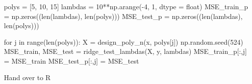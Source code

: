 \documentclass[
  letterpaper,
  DIV=11,
  numbers=noendperiod]{scrartcl}
\newenvironment{Shaded}{\begin{snugshade}}{\end{snugshade}}
\newcommand{\BuiltInTok}[1]{\textcolor[rgb]{0.00,0.23,0.31}{#1}}
\newcommand{\ControlFlowTok}[1]{\textcolor[rgb]{0.00,0.23,0.31}{#1}}
\newcommand{\DecValTok}[1]{\textcolor[rgb]{0.68,0.00,0.00}{#1}}
\newcommand{\KeywordTok}[1]{\textcolor[rgb]{0.00,0.23,0.31}{#1}}
\newcommand{\NormalTok}[1]{\textcolor[rgb]{0.00,0.23,0.31}{#1}}
\newcommand{\OperatorTok}[1]{\textcolor[rgb]{0.37,0.37,0.37}{#1}}
\begin{document}
\begin{Shaded}
\begin{Highlighting}[]
\NormalTok{polys }\OperatorTok{=}\NormalTok{ [}\DecValTok{5}\NormalTok{, }\DecValTok{10}\NormalTok{, }\DecValTok{15}\NormalTok{]}
\NormalTok{lambdas }\OperatorTok{=} \DecValTok{10}\OperatorTok{**}\NormalTok{np.arange(}\OperatorTok{{-}}\DecValTok{4}\NormalTok{, }\DecValTok{1}\NormalTok{, dtype }\OperatorTok{=} \BuiltInTok{float}\NormalTok{)}
\NormalTok{MSE\_train\_p }\OperatorTok{=}\NormalTok{ np.zeros((}\BuiltInTok{len}\NormalTok{(lambdas), }\BuiltInTok{len}\NormalTok{(polys)))}
\NormalTok{MSE\_test\_p }\OperatorTok{=}\NormalTok{ np.zeros((}\BuiltInTok{len}\NormalTok{(lambdas), }\BuiltInTok{len}\NormalTok{(polys)))}

\ControlFlowTok{for}\NormalTok{ j }\KeywordTok{in} \BuiltInTok{range}\NormalTok{(}\BuiltInTok{len}\NormalTok{(polys)):}
\NormalTok{    X }\OperatorTok{=}\NormalTok{ design\_poly\_n(x, polys[j])}
\NormalTok{    np.random.seed(}\DecValTok{524}\NormalTok{)}
\NormalTok{    MSE\_train, MSE\_test }\OperatorTok{=}\NormalTok{ ridge\_test\_lambdas(X, y, lambdas)}
\NormalTok{    MSE\_train\_p[:,j] }\OperatorTok{=}\NormalTok{ MSE\_train}
\NormalTok{    MSE\_test\_p[:,j] }\OperatorTok{=}\NormalTok{ MSE\_test}
\end{Highlighting}
\end{Shaded}

Hand over to R
\end{document}
